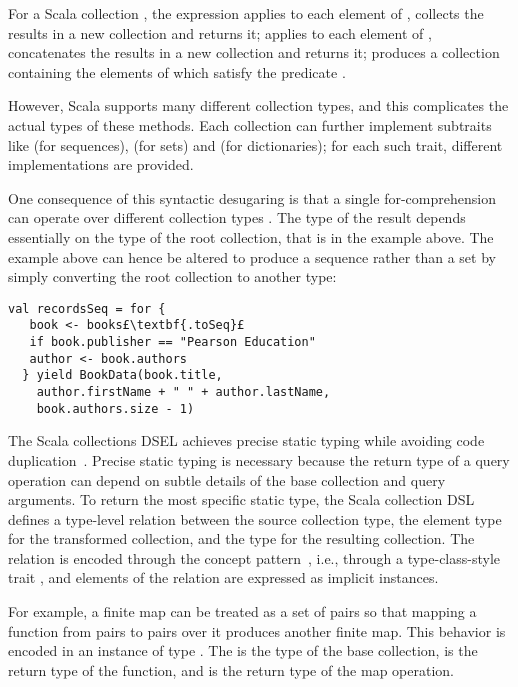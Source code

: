 For a Scala collection , the expression  applies  to each element of , collects the results in a new collection and returns it;  applies  to each element of , concatenates the results in a new collection and returns it;  produces a collection containing the elements of  which satisfy the predicate .

However, Scala supports many different collection types, and this complicates the actual types of these methods. Each collection can further implement subtraits like  (for sequences),  (for sets) and  (for dictionaries); for each such trait, different implementations are provided.

One consequence of this syntactic desugaring is that a single for-comprehension can operate over different collection types%
. The type of the result depends essentially on the type of the root collection, that is  in the example above. The example above can hence be altered to produce a sequence rather than a set by simply converting the root collection to another type:
\begin{lstlisting}
val recordsSeq = for {
   book <- books£\textbf{.toSeq}£
   if book.publisher == "Pearson Education"
   author <- book.authors
  } yield BookData(book.title,
    author.firstName + " " + author.lastName,
    book.authors.size - 1)
\end{lstlisting}

The Scala collections DSEL achieves precise static typing while avoiding code duplication~\citep{odersky2009fighting}. Precise static typing is necessary because the return type of a query operation can depend on subtle details of the base collection and query arguments. 
To return the most specific static type, the Scala collection DSL defines a type-level relation between the source collection type, the element type for the transformed collection, and the type for the resulting collection. The relation is encoded through the concept pattern~\citep{Oliveira10TCOI}, i.e., through a type-class-style trait , and elements of the relation are expressed as implicit instances.

For example, a finite map can be treated as a set of pairs so that mapping a function from pairs to pairs over it produces another finite map. This behavior is encoded in an instance of type \code{CanBuildFrom[Map[K, V], (K1, V1), Map[K1, V1]}. The  is the type of the base collection,  is the return type of the function, and  is the return type of the map operation.

